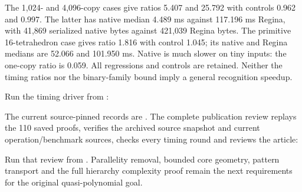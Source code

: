 The 1,024- and 4,096-copy cases give ratios 5.407 and 25.792 with controls
0.962 and 0.997. The latter has native median 4.489 ms against 117.196 ms
Regina, with 41,869 serialized native bytes against 421,039 Regina bytes.
The primitive 16-tetrahedron case gives ratio 1.816 with control 1.045;
its native and Regina medians are 52.066 and 101.950 ms. Native is much
slower on tiny inputs: the one-copy ratio is 0.059. All regressions and
controls are retained. Neither the timing ratios nor the binary-family
bound imply a general recognition speedup.

Run the timing driver from :
\begin{quote}\small
{}
\end{quote}
The current source-pinned records are .
The complete publication review replays the 110 saved proofs, verifies the
archived source snapshot and current operation/benchmark sources, checks
every timing round and reviews the article:
\begin{quote}\small
{}
\end{quote}
Run that review from . Parallelity removal, bounded core
geometry, pattern transport and the full hierarchy complexity proof remain
the next requirements for the original quasi-polynomial goal.
